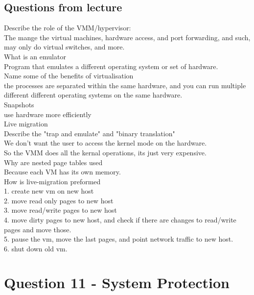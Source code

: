 \documentclass[a4paper,10pt,titlepage]{report}
\begin{document}
\subsection{Questions from lecture}
Describe the role of the VMM/hypervisor:\\
	The mange the virtual machines, hardware access, and port forwarding, and such, may only do virtual switches, and more.\\

	


What is an emulator\\
	Program that emulates a different operating system or set of hardware.\\


Name some of the benefits of virtualisation\\
	the processes are separated within the same hardware, and you can run multiple different different operating systems on the same hardware.\\
		Snapshots\\
	use hardware more efficiently\\
	Live migration\\


Describe the "trap and emulate" and "binary translation"\\
	We don't want the user to access the kernel mode on the hardware.\\
	
	So the VMM does all the kernal operations, its just very expensive.\\

Why are nested page tables used\\
	Because each VM has its own memory.\\
		

How is live-migration preformed\\
	1. create new vm on new host\\
	2. move read only pages to new host\\
	3. move read/write pages to new host\\
	4. move dirty pages to new host, and check if there are changes to read/write pages and move those.\\
	5. pause the vm, move the last pages, and point network traffic to new host. \\
	6. shut down old vm. \\



\section{Question 11 - System Protection}
\end{document}
